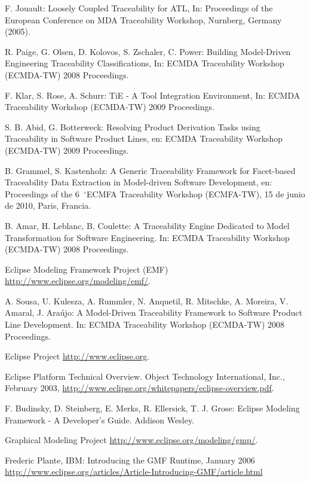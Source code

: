 \documentclass[a4paper,12pt,oneside,spanish]{book}
\newcommand{\grad}{\hspace{-2mm}$\phantom{a}^{\circ}$}
\begin{document}
\begin{thebibliography}{99}
 F. Jouault: Loosely Coupled Traceability for ATL, In: Proceedings of the European Conference on MDA Traceability Workshop, Nurnberg, Germany (2005).

 R. Paige, G. Olsen, D. Kolovos, S. Zschaler, C. Power: Building Model-Driven Engineering Traceability Classifications, In: ECMDA Traceability Workshop (ECMDA-TW) 2008 Proceedings.

 F. Klar, S. Rose, A. Schurr: TiE - A Tool Integration Environment, In: ECMDA Traceability Workshop (ECMDA-TW) 2009 Proceedings.

 S. B. Abid, G. Botterweck: Resolving Product Derivation Tasks using Traceability in Software Product Lines, en: ECMDA Traceability Workshop (ECMDA-TW) 2009 Proceedings.

 B. Grammel, S. Kastenholz: A Generic Traceability Framework for Facet-based Traceability Data Extraction in Model-driven Software Development, en: Proceedings of the 6\grad ECMFA Traceability Workshop (ECMFA-TW), 15 de junio de 2010, Paris, Francia.

 B. Amar, H. Leblanc, B. Coulette: A Traceability Engine Dedicated to Model Transformation for Software Engineering. In: ECMDA Traceability Workshop (ECMDA-TW) 2008 Proceedings.

 Eclipse Modeling Framework Project (EMF) \url{http://www.eclipse.org/modeling/emf/}.

 A. Sousa, U. Kulesza, A. Rummler, N. Anquetil, R. Mitschke, A. Moreira, V. Amaral, J. Araújo: A Model-Driven Traceability Framework to Software Product Line Development. In: ECMDA Traceability Workshop (ECMDA-TW) 2008 Proceedings.

 Eclipse Project \url{http://www.eclipse.org}.

 Eclipse Platform Technical Overview. Object Technology International, Inc., February 2003,
\url{http://www.eclipse.org/whitepapers/eclipse-overview.pdf}.

 F. Budinsky, D. Steinberg, E. Merks, R. Ellersick, T. J. Grose: Eclipse Modeling Framework - A Developer's Guide. Addison Wesley.

 Graphical Modeling Project \url{http://www.eclipse.org/modeling/gmp/}.

 Frederic Plante, IBM: Introducing the GMF Runtime, January 2006 \url{http://www.eclipse.org/articles/Article-Introducing-GMF/article.html}


\end{thebibliography}
\end{document}
